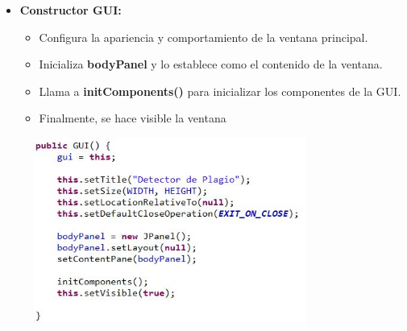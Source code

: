 \documentclass{article}
\begin{document}
	\begin{itemize}
	\item \textbf{Constructor GUI:}
	 \begin{itemize}
	 \item Configura la apariencia y comportamiento de la ventana principal.
	 \item Inicializa \textbf{bodyPanel} y lo establece como el contenido de la ventana.
	 \item Llama a \textbf{initComponents()} para inicializar los componentes de la GUI.
	 \item Finalmente, se hace visible la ventana
	 \end{itemize}
	\end{itemize}
	 \begin{figure}[H]
		\centering
		\includegraphics[width=0.8\textwidth,keepaspectratio]{img/GUI3.jpg}
	\end{figure}
	
\end{document}
